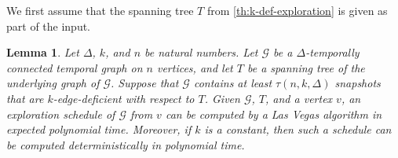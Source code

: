 \documentclass[a4paper,11pt]{article}
\newtheorem{lemma}[theorem]{Lemma}
\theoremstyle{definition}
\theoremstyle{remark}
\newcommand{\cG}{\ensuremath{\mathcal{G}}}
\begin{document}
    We first assume that the spanning tree $T$ from \cref{th:k-def-exploration} is given as part of the input.

    \begin{lemma}\label{lem:known-span-exploration}
        Let $\Delta$, $k$, and $n$ be natural numbers.
        Let $\cG$ be a $\Delta$-temporally connected temporal graph on $n$ vertices, and let $T$ be a spanning tree of the underlying graph of $\cG$. Suppose that $\cG$ contains at least $\tau(n,k,\Delta)$ snapshots that are $k$-edge-deficient with respect to $T$.
        Given $\cG$, $T$, and a vertex $v$, an exploration schedule of $\cG$ from $v$ can be computed by a Las Vegas algorithm in expected polynomial time. Moreover, if  $k$ is a constant, then such a schedule can be computed deterministically in polynomial time.
    \end{lemma}
\end{document}

